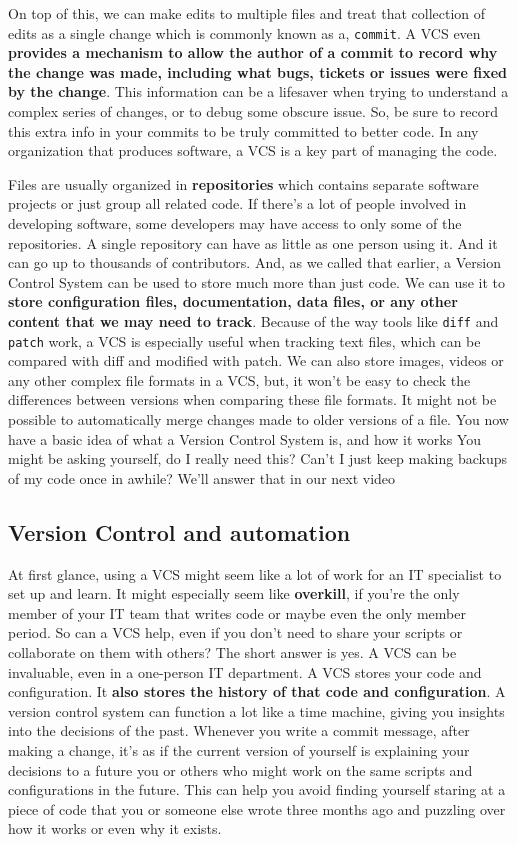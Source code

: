 	On top of this, we can make edits to multiple files and treat that collection of edits as a single change which is commonly known as a, \texttt{commit}. A VCS even \textbf{provides a mechanism to allow the author of a commit to record why the change was made, including what bugs, tickets or issues were fixed by the change}. 
	This information can be a lifesaver when trying to understand a complex series of changes, or to debug some obscure issue. So, be sure to record this extra info in your commits to be truly committed to better code. In any organization that produces software, a VCS is a key part of managing the code. 
	
	Files are usually organized in \textbf{repositories} which contains separate software projects or just group all related code. If there's a lot of people involved in developing software, some developers may have access to only some of the repositories. 
	A single repository can have as little as one person using it. And it can go up to thousands of contributors. And, as we called that earlier, a Version Control System can be used to store much more than just code. We can use it to \textbf{store configuration files, documentation, data files, or any other content that we may need to track}. Because of the way tools like \texttt{diff} and \texttt{patch} work, a VCS is especially useful when tracking text files, which can be compared with diff and modified with patch. We can also store images, videos or any other complex file formats in a VCS, but, it won't be easy to check the differences between versions when comparing these file formats. It might not be possible to automatically merge changes made to older versions of a file. You now have a basic idea of what a Version Control System is, and how it works You might be asking yourself, do I really need this? Can't I just keep making backups of my code once in awhile? We'll answer that in our next video
	
	\subsection{Version Control and automation}
	
	At first glance, using a VCS might seem like a lot of work for an IT specialist to set up and learn. It might especially seem like \textbf{overkill}, if you're the only member of your IT team that writes code or maybe even the only member period. 
	So can a VCS help, even if you don't need to share your scripts or collaborate on them with others? The short answer is yes. A VCS can be invaluable, even in a one-person IT department. A VCS stores your code and configuration. It \textbf{also stores the history of that code and configuration}. A version control system can function a lot like a time machine, giving you insights into the decisions of the past. Whenever you write a commit message, after making a change, it's as if the current version of yourself is explaining your decisions to a future you or others who might work on the same scripts and configurations in the future. This can help you avoid finding yourself staring at a piece of code that you or someone else wrote three months ago and puzzling over how it works or even why it exists. 
	
